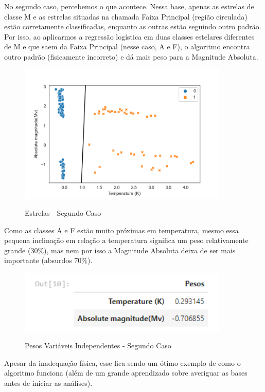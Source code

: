 \documentclass[12pt]{article}
\begin{document}
\hspace{0.4cm}No segundo caso, percebemos o que acontece. Nessa base, apenas as estrelas de classe M e as estrelas situadas na chamada Faixa Principal (região circulada) estão corretamente classificadas, enquanto as outras estão seguindo outro padrão. Por isso, ao aplicarmos a regressão logística em duas classes estelares diferentes de M e que saem da Faixa Principal (nesse caso, A e F), o algoritmo encontra outro padrão (fisicamente incorreto) e dá mais peso para a Magnitude Absoluta.

\begin{figure}[h]
\caption{Estrelas - Segundo Caso}
\centering
\includegraphics[width=10cm]{estrelas.png}
\label{figura:estrelas}
\end{figure}

Como as classes A e F estão muito próximas em temperatura, mesmo essa pequena inclinação em relação a temperatura significa um peso relativamente grande (30\%), mas nem por isso a Magnitude Absoluta deixa de ser mais importante (absurdos 70\%). 

\begin{figure}[h]
\caption{Pesos Variáveis Independentes - Segundo Caso}
\centering
\includegraphics[width=10cm]{out6.png}
\label{figura:out6}
\end{figure}

\hspace{0.4cm}Apesar da inadequação física, esse fica sendo um ótimo exemplo de como o algoritmo funciona (além de um grande aprendizado sobre averiguar as bases antes de iniciar as análises).
\end{document}
